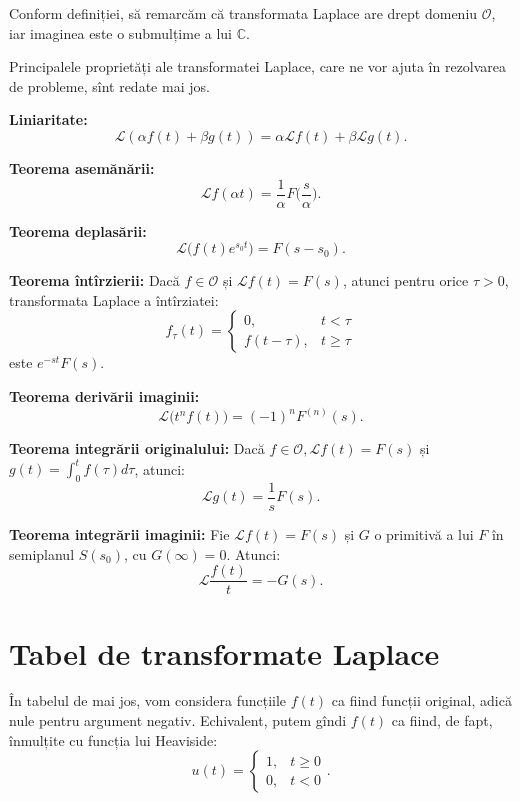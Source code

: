 \documentclass[12pt,a4paper]{article}
\newcommand\kal{\mathcal}
\newcommand\ds{\displaystyle}
\newcommand\CC{\mathbb{C}}
\newcommand\Lap{\mathcal{L}}
\theoremstyle{dotless}
\theoremstyle{dotlessdr}
\begin{document}
Conform definiției, să remarcăm că transformata Laplace are drept domeniu $ \kal{O} $,
iar imaginea este o submulțime a lui $ \CC $.

\vspace{1cm}

Principalele proprietăți ale transformatei Laplace, care ne vor ajuta în rezolvarea
de probleme, sînt redate mai jos.

\textbf{Liniaritate:}
\[
  \Lap (\alpha f(t) + \beta g(t)) = \alpha \Lap f(t) + \beta \Lap g(t).
\]

\textbf{Teorema asemănării:}
\[
  \Lap f(\alpha t) = \frac{1}{\alpha} F \Big( \frac{s}{\alpha} \Big).
\]

\textbf{Teorema deplasării:}
\[
  \Lap \big( f(t) e^{s_0 t} \big) = F(s - s_0).
\]

\textbf{Teorema întîrzierii:} Dacă $ f \in \kal{O} $ și $ \Lap f(t) = F(s) $,
atunci pentru orice $ \tau > 0 $, transformata Laplace a întîrziatei:
\[
  f_\tau(t) =
  \begin{cases}
    0, & t < \tau \\
    f(t - \tau), & t \geq \tau
  \end{cases}
\]
este $ e^{-st} F(s) $.

\textbf{Teorema derivării imaginii:}
\[
  \Lap \big( t^n f(t) \big) = (-1)^n F^{(n)} (s).
\]

\textbf{Teorema integrării originalului:} Dacă $ f \in \kal{O}, \Lap f(t) = F(s) $ și
$ g(t) = \ds\int_0^t f(\tau) d\tau $, atunci:
\[
  \Lap g(t) = \frac{1}{s} F(s).
\]

\textbf{Teorema integrării imaginii:} Fie $ \Lap f(t) = F(s) $ și $ G $ o primitivă
a lui $ F $ în semiplanul $ S(s_0) $, cu $ G(\infty) = 0 $. Atunci:
\[
  \Lap \frac{f(t)}{t} = -G(s).
\]


\newpage

\section*{Tabel de transformate Laplace}

\indent\indent În tabelul de mai jos, vom considera funcțiile $ f(t) $ ca fiind funcții original,
adică nule pentru argument negativ. Echivalent, putem gîndi $ f(t) $ ca fiind, de fapt,
înmulțite cu funcția lui Heaviside:
\[
  u(t) =
  \begin{cases}
    1, & t \geq 0 \\
    0, & t < 0 
  \end{cases}.
\]
\end{document}
